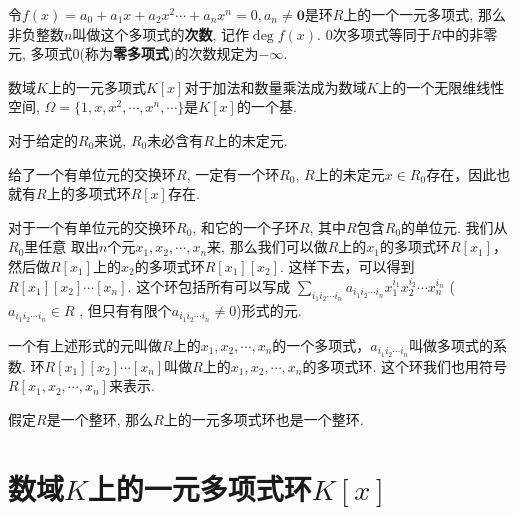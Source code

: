 \begin{Definition}[多项式的次数]
令$f(x) = a_0 + a_1 x + a_2 x^2 \cdots + a_n x^n = 0, a_n \neq \mathbf{0}$是环$R$上的一个一元多项式,
那么非负整数$n$叫做这个多项式的\textbf{次数}, 记作$\deg f(x)$. $0$次多项式等同于$R$中的非零元, 多项式$0$(称为\textbf{零多项式})的次数规定为$-\infty$.
\end{Definition}

\begin{Note}
数域$K$上的一元多项式$K[x]$对于加法和数量乘法成为数域$K$上的一个无限维线性空间, 
$\Omega = \{ 1, x, x^2, \cdots, x^n, \cdots \}$是$K[x]$的一个基.
\end{Note}

\begin{Proposition}
对于给定的$R_0$来说, $R_0$未必含有$R$上的未定元.
\end{Proposition}

\begin{Theorem}
给了一个有单位元的交换环$R$, 一定有一个环$R_0$, $R$上的未定元$x \in R_0$存在，因此也就有$R$上的多项式环$R[x]$存在.
\end{Theorem}

\begin{Note}
对于一个有单位元的交换环$R_0$, 和它的一个子环$R$, 其中$R$包含$R_0$的单位元. 我们从$R_0$里任意
取出$n$个元$x_1, x_2, \cdots, x_n$来, 那么我们可以做$R$上的$x_1$的多项式环$R[x_1]$，然后做$R[x_1]$上的$x_2$的多项式环$R[x_1][x_2]$. 这样下去，可以得到$R[x_1][x_2]\cdots[x_n]$. 这个环包括所有可以写成 
$\displaystyle \sum_{i_1 i_2 \cdots i_n} a_{i_1 i_2 \cdots i_n} x_1^{i_1} x_2^{i_2} \cdots x_n^{i_n}$ ($a_{i_1 i_2 \cdots i_n} \in R$
, 但只有有限个$a_{i_1 i_2 \cdots i_n} \neq 0$)形式的元.
\end{Note}

\begin{Definition}
一个有上述形式的元叫做$R$上的$x_1, x_2, \cdots, x_n$的一个多项式，$a_{i_1 i_2 \cdots i_n}$叫做多项式的系数. 环$R[x_1][x_2]\cdots[x_n]$叫做$R$上的$x_1, x_2, \cdots, x_n$的多项式环. 这个环我们也用符号$R[x_1, x_2, \cdots, x_n]$来表示.
\end{Definition}

\begin{Proposition}
假定$R$是一个整环, 那么$R$上的一元多项式环也是一个整环.
\end{Proposition}


\section{数域$K$上的一元多项式环$K[x]$} %

